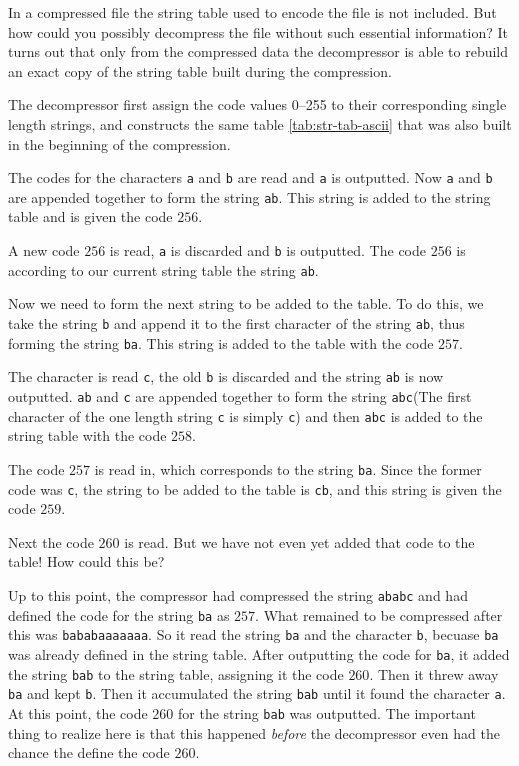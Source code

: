 In a \lzw compressed file the string table used to encode the file is
not included. But how could you possibly decompress the file without
such essential information? It turns out that only from the compressed
data the decompressor is able to rebuild an exact copy of the string
table built during the compression.

The decompressor first assign the code values 0--255 to their
corresponding single length strings, and constructs the same table
\ref{tab:str-tab-ascii} that was also built in the beginning of the
compression.

The codes for the characters \texttt{a} and \texttt{b} are read and
\texttt{a} is outputted. Now \texttt{a} and \texttt{b} are appended
together to form the string \texttt{ab}. This string is added to the
string table and is given the code $256$.

A new code $256$ is read, \texttt{a} is discarded and \texttt{b} is
outputted. The code $256$ is according to our current string table the
string \texttt{ab}.

Now we need to form the next string to be added to the table. To do
this, we take the string \texttt{b} and append it to the first
character of the string \texttt{ab}, thus forming the string
\texttt{ba}. This string is added to the table with the code $257$.

The character is read \texttt{c}, the old \texttt{b} is discarded and the string
\texttt{ab} is now outputted. \texttt{ab} and \texttt{c} are appended together
to form the string \texttt{abc}(The first character of the one length
string \texttt{c} is simply \texttt{c}) and then \texttt{abc} is added to the string
table with the code $258$.

The code $257$ is read in, which corresponds to the string
\texttt{ba}. Since the former code was \texttt{c}, the string to be
added to the table is \texttt{cb}, and this string is given the code
$259$.

Next the code $260$ is read. But we have not even yet added that code
to the table! How could this be?

Up to this point, the compressor had compressed the string
\texttt{ababc} and had defined the code for the string \texttt{ba} as
$257$. What remained to be compressed after this was
\texttt{bababaaaaaaa}. So it read the string \texttt{ba} and the
character \texttt{b}, becuase \texttt{ba} was already defined in the
string table. After outputting the code for \texttt{ba}, it added the
string \texttt{bab} to the string table, assigning it the code
$260$. Then it threw away \texttt{ba} and kept \texttt{b}. Then it
accumulated the string \texttt{bab} until it found the character
\texttt{a}. At this point, the code $260$ for the string \texttt{bab}
was outputted.  The important thing to realize here is that this
happened \textit{before} the decompressor even had the chance the
define the code $260$.

